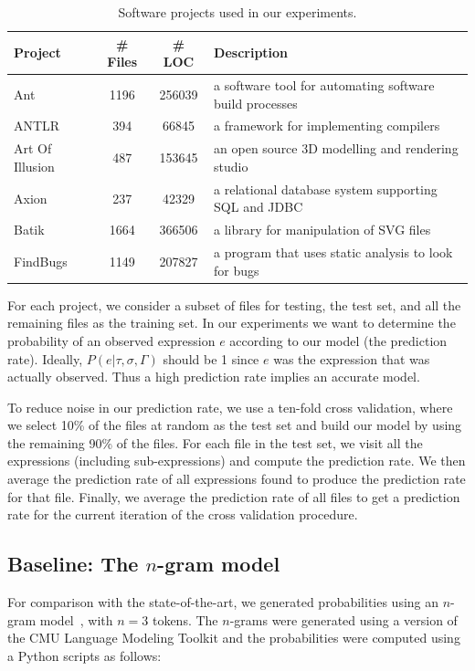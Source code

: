 \documentclass{article} %
\begin{document}
\setlength{\textfloatsep}{25pt}
\begin{table}[t]
\centering
\begin{tabular}{|l|c|c|l|}
\hline
\textbf{Project} & \textbf{\# Files} & \textbf{\# LOC} & \textbf{Description} \\
\hline
Ant & 1196 & 256039 & a software tool for automating software build processes \\
ANTLR & 394 & 66845 & a framework for implementing compilers \\
Art Of Illusion & 487 & 153645 & an open source 3D modelling and rendering studio \\
Axion & 237 & 42329 & a relational database system supporting SQL and JDBC \\
Batik & 1664 & 366506 & a library for manipulation of SVG files \\
FindBugs & 1149 & 207827 & a program that uses static analysis to look for bugs \\
\hline
\end{tabular}
\caption{Software projects used in our experiments.}
\label{tab:projects}
\end{table}
For each project, we consider a subset of files for testing, the test set, and all the remaining files as the training set.
In our experiments we want to determine the probability of an observed expression $e$ according to our model (the prediction rate). Ideally, $P(e| \tau, \sigma, \Gamma)$ should be 1 since $e$ was the expression that was actually observed. Thus a high prediction rate implies an accurate model.

To reduce noise in our prediction rate, we use a ten-fold cross validation, where we select 10\% of the files at random as the test set and build our model by using the remaining 90\% of the files. For each file in the test set, we visit all the expressions (including sub-expressions) and compute the prediction rate. We then average the prediction rate of all expressions found to produce the prediction rate for that file. Finally, we average the prediction rate of all files to get a prediction rate for the current iteration of the cross validation procedure.

\subsection*{Baseline: The $n$-gram model}
For comparison with the state-of-the-art, we generated probabilities using an $n$-gram model~\cite{Hindle:2012:NS:2337223.2337322}, with $n = 3$ tokens. The $n$-grams were generated using a version of the CMU Language Modeling Toolkit and the probabilities were computed using a Python scripts as follows:
\end{document}
